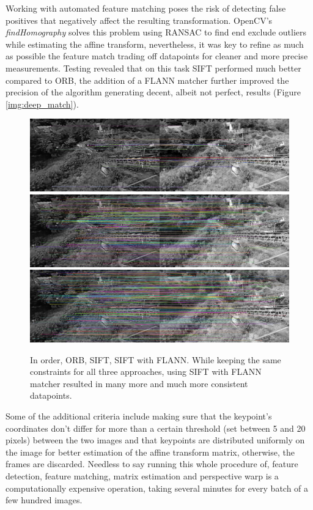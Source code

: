 Working with automated feature matching poses the risk of detecting false positives that negatively affect the resulting transformation. OpenCV's \emph{findHomography} solves this problem using RANSAC to find end exclude outliers while estimating the affine transform, nevertheless, it was key to refine as much as possible the feature match trading off datapoints for cleaner and more precise measurements.
Testing revealed that on this task SIFT performed much better compared to ORB, the addition of a FLANN matcher further improved the precision of the algorithm generating decent, albeit not perfect, results (Figure \ref{img:deep_match}).

\begin{figure}[H]
  \centering
  \includegraphics[width=1\textwidth]{figures/ORB.png}
  \includegraphics[width=1\textwidth]{figures/SIFT.png}
  \includegraphics[width=1\textwidth]{figures/FLANN.png}
  \caption{In order, ORB, SIFT, SIFT with FLANN. While keeping the same constraints for all three approaches, using SIFT with FLANN matcher resulted in many more and much more consistent datapoints.}
  \label{img:orb_sift}
\end{figure}

Some of the additional criteria include making sure that the keypoint's coordinates don't differ for more than a certain threshold (set between 5 and 20 pixels) between the two images and that keypoints are distributed uniformly on the image for better estimation of the affine transform matrix, otherwise, the frames are discarded. Needless to say running this whole procedure of, feature detection, feature matching, matrix estimation and perspective warp is a computationally expensive operation, taking several minutes for every batch of a few hundred images.

